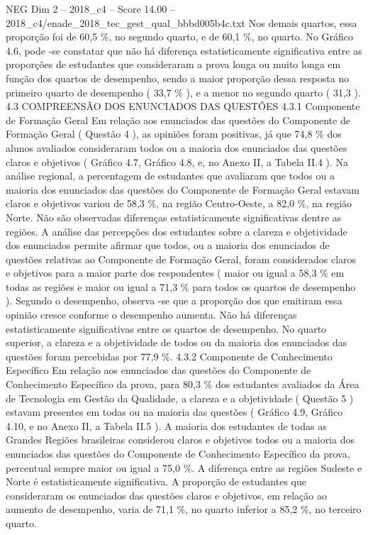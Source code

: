 \begin{textsample}{NEG Dim 2 – 2018\_c4 – Score 14.00 – 2018\_c4/enade\_2018\_tec\_gest\_qual\_bbbd005b4c.txt}
Nos demais quartos, essa proporção foi de 60,5 \%, no segundo quarto, e de 60,1 \%, no quarto.
No Gráfico 4.6, pode -se constatar que não há diferença estatisticamente significativa entre as proporções de estudantes que consideraram a prova longa ou muito longa em função dos quartos de desempenho, sendo a maior proporção dessa resposta no primeiro quarto de desempenho ( 33,7 \% ), e a menor no segundo quarto ( 31,3 ). 4.3 COMPREENSÃO DOS ENUNCIADOS DAS QUESTÕES 4.3.1 Componente de Formação Geral Em relação aos enunciados das questões do Componente de Formação Geral ( Questão 4 ), as opiniões foram positivas, já que 74,8 \% dos alunos avaliados consideraram todos ou a maioria dos enunciados das questões claros e objetivos ( Gráfico 4.7, Gráfico 4.8, e, no Anexo II, a Tabela II.4 ).
Na análise regional, a percentagem de estudantes que avaliaram que todos ou a maioria dos enunciados das questões do Componente de Formação Geral estavam claros e objetivos variou de 58,3 \%, na região Centro-Oeste, a 82,0 \%, na região Norte.
Não são observadas diferenças estatisticamente significativas dentre as regiões.
A análise das percepções dos estudantes sobre a clareza e objetividade dos enunciados permite afirmar que todos, ou a maioria dos enunciados de questões relativas ao Componente de Formação Geral, foram considerados claros e objetivos para a maior parte dos respondentes ( maior ou igual a 58,3 \% em todas as regiões e maior ou igual a 71,3 \% para todos os quartos de desempenho ).
Segundo o desempenho, observa -se que a proporção dos que emitiram essa opinião cresce conforme o desempenho aumenta.
Não há diferenças estatisticamente significativas entre os quartos de desempenho.
No quarto superior, a clareza e a objetividade de todos ou da maioria dos enunciados das questões foram percebidas por 77,9 \%. 4.3.2 Componente de Conhecimento Específico Em relação aos enunciados das questões do Componente de Conhecimento Específico da prova, para 80,3 \% dos estudantes avaliados da Área de Tecnologia em Gestão da Qualidade, a clareza e a objetividade ( Questão 5 ) estavam presentes em todas ou na maioria das questões ( Gráfico 4.9, Gráfico 4.10, e no Anexo II, a Tabela II.5 ).
A maioria dos estudantes de todas as Grandes Regiões brasileiras considerou claros e objetivos todos ou a maioria dos enunciados das questões do Componente de Conhecimento Específico da prova, percentual sempre maior ou igual a 75,0 \%.
A diferença entre as regiões Sudeste e Norte é estatisticamente significativa.
A proporção de estudantes que consideraram os enunciados das questões claros e objetivos, em relação ao aumento de desempenho, varia de 71,1 \%, no quarto inferior a 85,2 \%, no terceiro quarto.

\end{textsample}
